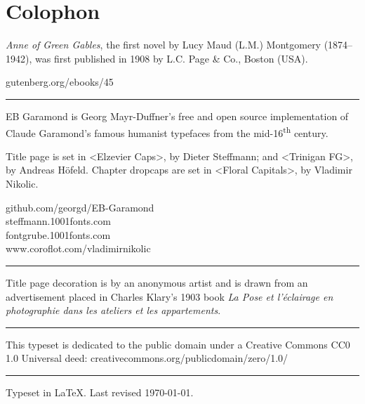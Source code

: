 \documentclass[
a5paper,
]{scrbook}
\begin{document}
\chapter*{Colophon}
\begin{center}
\begin{minipage}{\textwidth}
\textit{Anne of Green Gables}, the first novel by Lucy Maud (L.M.) Montgomery (1874–1942), was first published in 1908 by L.C. Page \& Co., Boston (USA).
\end{minipage}
\vfill
gutenberg.org/ebooks/45
\vfill
\rule{0.5\textwidth}{.4pt}
\vfill
\begin{minipage}{\textwidth}
EB Garamond is Georg Mayr-Duffner's free and open source implementation of Claude Garamond’s famous humanist typefaces from the mid-16\textsuperscript{th} century.

Title page is set in <Elzevier Caps>, by Dieter Steffmann; and <Trinigan FG>, by Andreas Höfeld. Chapter dropcaps are set in <Floral Capitals>, by Vladimir Nikolic. 
\end{minipage}
\vfill
github.com/georgd/EB-Garamond\\steffmann.1001fonts.com\\fontgrube.1001fonts.com\\www.coroflot.com/vladimirnikolic
\vfill
\rule{0.5\textwidth}{.4pt}
\vfill
\begin{minipage}{\textwidth}
Title page decoration is by an anonymous artist and is drawn from an advertisement placed in Charles Klary's 1903 book \textit{La Pose et l’éclairage en photographie dans les ateliers et les appartements}.
\end{minipage}
\vfill
\rule{0.5\textwidth}{.4pt}
\vfill
\begin{minipage}{\textwidth}
This typeset is dedicated to the public domain under a Creative Commons CC0 1.0 Universal deed: creativecommons.org/publicdomain/zero/1.0/
\end{minipage}
\vfill
\rule{0.5\textwidth}{.4pt}
\vfill
Typeset in \LaTeX{}. Last revised \today.
\end{center}
\thispagestyle{empty}
\end{document}
